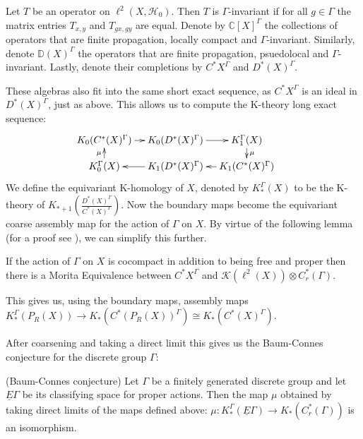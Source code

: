 \begin{definition}
Let $T$ be an operator on $\ell^{2}(X,\mathcal{H}_{0})$. Then $T$ is $\Gamma$-invariant if for all $g \in \Gamma$ the matrix entries $T_{x,y}$ and $T_{gx,gy}$ are equal. Denote by $\mathbb{C}[X]^{\Gamma}$ the collections of operators that are finite propagation, locally compact and $\Gamma$-invariant. Similarly, denote $\mathbb{D}(X)^{\Gamma}$ the operators that are finite propagation, psuedolocal and $\Gamma$-invariant. Lastly, denote their completions by $C^{*}X^{\Gamma}$ and $D^{*}(X)^{\Gamma}$.
\end{definition}

These algebras also fit into the same short exact sequence, as $C^{*}X^{\Gamma}$ is an ideal in $D^{*}(X)^{\Gamma}$, just as above. This allows us to compute the K-theory long exact sequence:
\begin{equation*}
\xymatrix@=1em{
K_{0}(C^{*}(X)^{\Gamma}) \ar[r] & K_{0}(D^{*}(X)^{\Gamma}) \ar[r]& K_{1}^{\Gamma}(X)\ar[d]^{\mu} & \\
K_{0}^{\Gamma}(X)\ar[u]^{\mu}& K_{1}(D^{*}(X)^{\Gamma}) \ar[l]& K_{1}(C^{*}(X)^{\Gamma})\ar[l] &
}
\end{equation*}
We define the equivariant K-homology of $X$, denoted by $K_{*}^{\Gamma}(X)$ to be the K-theory of $K_{*+1}(\frac{D^{*}(X)^{\Gamma}}{C^{*}(X)^{\Gamma}}).$  Now the boundary maps become the equivariant coarse assembly map for the action of $\Gamma$ on $X$. By virtue of the following lemma (for a proof see \cite{explg1}), we can simplify this further.

\begin{lemma}
If the action of $\Gamma$ on $X$ is cocompact in addition to being free and proper then there is a Morita Equivalence between $C^{*}X^{\Gamma}$ and $\mathcal{K}(\ell^{2}(X))\otimes C^{*}_{r}(\Gamma)$.
\end{lemma}

This gives us, using the boundary maps, assembly maps $K_{*}^{\Gamma}(P_{R}(X)) \rightarrow K_{*}(C^{*}(P_{R}(X))^{\Gamma}) \cong K_{*}(C^{*}(X)^{\Gamma})$.

After coarsening and taking a direct limit this gives us the Baum-Connes conjecture for the discrete group $\Gamma$:

\begin{conjecture}(Baum-Connes conjecture)
Let $\Gamma$ be a finitely generated discrete group and let $\underline{E}\Gamma$ be its classifying space for proper actions. Then the map $\mu$ obtained by taking direct limits of the maps defined above: $\mu: K_{*}^{\Gamma}(\underline{E}\Gamma) \rightarrow K_{*}(C^{*}_{r}(\Gamma))$ is an isomorphism.
\end{conjecture}

